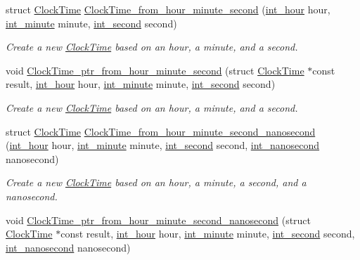 \begin{DoxyCompactItemize}
struct \hyperlink{structClockTime}{Clock\-Time} \hyperlink{clock-time_8h_a7881866a32c7c6027257208e456a5041}{Clock\-Time\-\_\-from\-\_\-hour\-\_\-minute\-\_\-second} (\hyperlink{types_8h_abc83767329d565949a30f9990b5b2323}{int\-\_\-hour} hour, \hyperlink{types_8h_ac1c9417e7360815b48bbc1efa2b8240c}{int\-\_\-minute} minute, \hyperlink{types_8h_a48e89dcdfecb9766dce0baf6254d089e}{int\-\_\-second} second)
\begin{DoxyCompactList}\small\item\em Create a new \hyperlink{structClockTime}{Clock\-Time} based on an hour, a minute, and a second. \end{DoxyCompactList}\item 
void \hyperlink{clock-time_8h_a1454b4a83c57bff16b493757579f1dd6}{Clock\-Time\-\_\-ptr\-\_\-from\-\_\-hour\-\_\-minute\-\_\-second} (struct \hyperlink{structClockTime}{Clock\-Time} $\ast$const result, \hyperlink{types_8h_abc83767329d565949a30f9990b5b2323}{int\-\_\-hour} hour, \hyperlink{types_8h_ac1c9417e7360815b48bbc1efa2b8240c}{int\-\_\-minute} minute, \hyperlink{types_8h_a48e89dcdfecb9766dce0baf6254d089e}{int\-\_\-second} second)
\begin{DoxyCompactList}\small\item\em Create a new \hyperlink{structClockTime}{Clock\-Time} based on an hour, a minute, and a second. \end{DoxyCompactList}\item 
struct \hyperlink{structClockTime}{Clock\-Time} \hyperlink{clock-time_8h_adbf645da18ea1c4bd1cb22f7107f9112}{Clock\-Time\-\_\-from\-\_\-hour\-\_\-minute\-\_\-second\-\_\-nanosecond} (\hyperlink{types_8h_abc83767329d565949a30f9990b5b2323}{int\-\_\-hour} hour, \hyperlink{types_8h_ac1c9417e7360815b48bbc1efa2b8240c}{int\-\_\-minute} minute, \hyperlink{types_8h_a48e89dcdfecb9766dce0baf6254d089e}{int\-\_\-second} second, \hyperlink{types_8h_a6bb2edd220168240795ae6d50d7bf140}{int\-\_\-nanosecond} nanosecond)
\begin{DoxyCompactList}\small\item\em Create a new \hyperlink{structClockTime}{Clock\-Time} based on an hour, a minute, a second, and a nanosecond. \end{DoxyCompactList}\item 
void \hyperlink{clock-time_8h_a9004b5ad97da41edd6a2be814bb9d393}{Clock\-Time\-\_\-ptr\-\_\-from\-\_\-hour\-\_\-minute\-\_\-second\-\_\-nanosecond} (struct \hyperlink{structClockTime}{Clock\-Time} $\ast$const result, \hyperlink{types_8h_abc83767329d565949a30f9990b5b2323}{int\-\_\-hour} hour, \hyperlink{types_8h_ac1c9417e7360815b48bbc1efa2b8240c}{int\-\_\-minute} minute, \hyperlink{types_8h_a48e89dcdfecb9766dce0baf6254d089e}{int\-\_\-second} second, \hyperlink{types_8h_a6bb2edd220168240795ae6d50d7bf140}{int\-\_\-nanosecond} nanosecond)

\end{DoxyCompactItemize}
